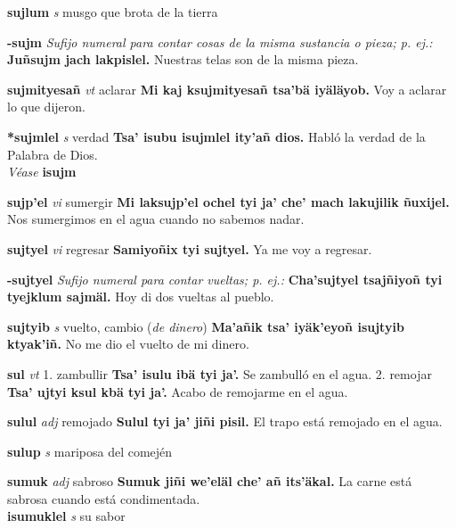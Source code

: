 \documentclass[10pt]{scrbook}
\newcommand{\entry}[1]{\textbf{#1}}
\newcommand{\onedefinition}[1]{#1.}
\newcommand{\nontranslationdef}[1]{\textit{#1}}
\newcommand{\partofspeech}[1]{\textit{#1}}
\newcommand{\spanishtranslation}[1]{#1}
\newcommand{\clarification}[1]{(\textit{#1})}
\newcommand{\cholexample}[1]{\textbf{#1}}
\newcommand{\exampletranslation}[1]{#1}
\newcommand{\alsosee}[1]{\\\textit{Véase} \textbf{#1}}
\newcommand{\secondaryentry}[1]{\\\textbf{#1}}
\newcommand{\secondpartofspeech}[1]{\textit{#1}}
\newcommand{\secondtranslation}[1]{#1}
\begin{document}
\begin{multicols}{2}
\entry{sujlum}
\partofspeech{s}
\spanishtranslation{musgo que brota de la tierra}

\entry{-sujm}
\nontranslationdef{Sufijo numeral para contar cosas de la misma sustancia o pieza; p. ej.:}
\cholexample{Juñsujm jach lakpislel.}
\exampletranslation{Nuestras telas son de la misma pieza.}

\entry{sujmityesañ}
\partofspeech{vt}
\spanishtranslation{aclarar}
\cholexample{Mi kaj ksujmityesañ tsa'bä iyäläyob.}
\exampletranslation{Voy a aclarar lo que dijeron.}

\entry{*sujmlel}
\partofspeech{s}
\spanishtranslation{verdad}
\cholexample{Tsa' isubu isujmlel ity'añ dios.}
\exampletranslation{Habló la verdad de la Palabra de Dios.}
\alsosee{isujm}

\entry{sujp'el}
\partofspeech{vi}
\spanishtranslation{sumergir}
\cholexample{Mi laksujp'el ochel tyi ja' che' mach lakujilik ñuxijel.}
\exampletranslation{Nos sumergimos en el agua cuando no sabemos nadar.}

\entry{sujtyel}
\partofspeech{vi}
\spanishtranslation{regresar}
\cholexample{Samiyoñix tyi sujtyel.}
\exampletranslation{Ya me voy a regresar.}

\entry{-sujtyel}
\nontranslationdef{Sufijo numeral para contar vueltas; p. ej.:}
\cholexample{Cha'sujtyel tsajñiyoñ tyi tyejklum sajmäl.}
\exampletranslation{Hoy di dos vueltas al pueblo.}

\entry{sujtyib}
\partofspeech{s}
\spanishtranslation{vuelto, cambio}
\clarification{de dinero}
\cholexample{Ma'añik tsa' iyäk'eyoñ isujtyib ktyak'iñ.}
\exampletranslation{No me dio el vuelto de mi dinero.}

\entry{sul}
\partofspeech{vt}
\onedefinition{1}
\spanishtranslation{zambullir}
\cholexample{Tsa' isulu ibä tyi ja'.}
\exampletranslation{Se zambulló en el agua.}
\onedefinition{2}
\spanishtranslation{remojar}
\cholexample{Tsa' ujtyi ksul kbä tyi ja'.}
\exampletranslation{Acabo de remojarme en el agua.}

\entry{sulul}
\partofspeech{adj}
\spanishtranslation{remojado}
\cholexample{Sulul tyi ja' jiñi pisil.}
\exampletranslation{El trapo está remojado en el agua.}

\entry{sulup}
\partofspeech{s}
\spanishtranslation{mariposa del comején}

\entry{sumuk}
\partofspeech{adj}
\spanishtranslation{sabroso}
\cholexample{Sumuk jiñi we'eläl che' añ its'äkal.}
\exampletranslation{La carne está sabrosa cuando está condimentada.}
\secondaryentry{isumuklel}
\secondpartofspeech{s}
\secondtranslation{su sabor}


\end{multicols}
\end{document}
